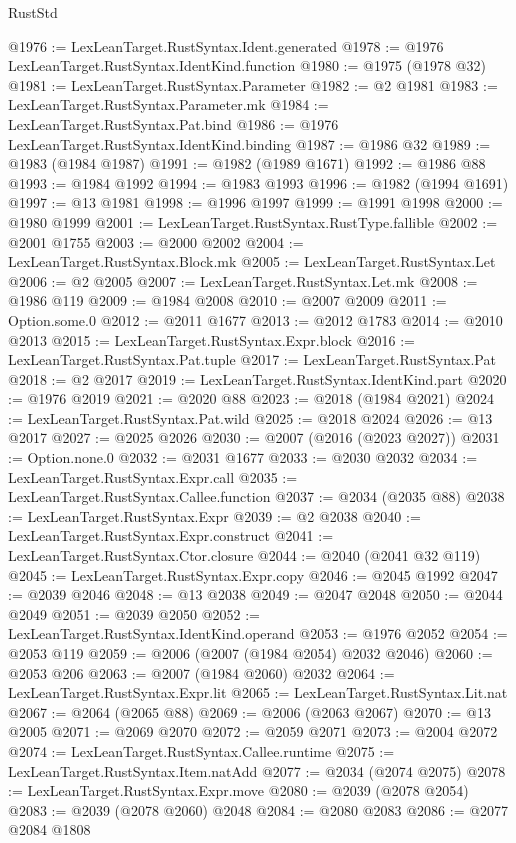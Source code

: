 \begin{lexlean}{RustStd}
\begin{coremodule}
@1976 := LexLeanTarget.RustSyntax.Ident.generated
@1978 := @1976 LexLeanTarget.RustSyntax.IdentKind.function
@1980 := @1975 (@1978 @32)
@1981 := LexLeanTarget.RustSyntax.Parameter
@1982 := @2 @1981
@1983 := LexLeanTarget.RustSyntax.Parameter.mk
@1984 := LexLeanTarget.RustSyntax.Pat.bind
@1986 := @1976 LexLeanTarget.RustSyntax.IdentKind.binding
@1987 := @1986 @32
@1989 := @1983 (@1984 @1987)
@1991 := @1982 (@1989 @1671)
@1992 := @1986 @88
@1993 := @1984 @1992
@1994 := @1983 @1993
@1996 := @1982 (@1994 @1691)
@1997 := @13 @1981
@1998 := @1996 @1997
@1999 := @1991 @1998
@2000 := @1980 @1999
@2001 := LexLeanTarget.RustSyntax.RustType.fallible
@2002 := @2001 @1755
@2003 := @2000 @2002
@2004 := LexLeanTarget.RustSyntax.Block.mk
@2005 := LexLeanTarget.RustSyntax.Let
@2006 := @2 @2005
@2007 := LexLeanTarget.RustSyntax.Let.mk
@2008 := @1986 @119
@2009 := @1984 @2008
@2010 := @2007 @2009
@2011 := Option.some.{0}
@2012 := @2011 @1677
@2013 := @2012 @1783
@2014 := @2010 @2013
@2015 := LexLeanTarget.RustSyntax.Expr.block
@2016 := LexLeanTarget.RustSyntax.Pat.tuple
@2017 := LexLeanTarget.RustSyntax.Pat
@2018 := @2 @2017
@2019 := LexLeanTarget.RustSyntax.IdentKind.part
@2020 := @1976 @2019
@2021 := @2020 @88
@2023 := @2018 (@1984 @2021)
@2024 := LexLeanTarget.RustSyntax.Pat.wild
@2025 := @2018 @2024
@2026 := @13 @2017
@2027 := @2025 @2026
@2030 := @2007 (@2016 (@2023 @2027))
@2031 := Option.none.{0}
@2032 := @2031 @1677
@2033 := @2030 @2032
@2034 := LexLeanTarget.RustSyntax.Expr.call
@2035 := LexLeanTarget.RustSyntax.Callee.function
@2037 := @2034 (@2035 @88)
@2038 := LexLeanTarget.RustSyntax.Expr
@2039 := @2 @2038
@2040 := LexLeanTarget.RustSyntax.Expr.construct
@2041 := LexLeanTarget.RustSyntax.Ctor.closure
@2044 := @2040 (@2041 @32 @119)
@2045 := LexLeanTarget.RustSyntax.Expr.copy
@2046 := @2045 @1992
@2047 := @2039 @2046
@2048 := @13 @2038
@2049 := @2047 @2048
@2050 := @2044 @2049
@2051 := @2039 @2050
@2052 := LexLeanTarget.RustSyntax.IdentKind.operand
@2053 := @1976 @2052
@2054 := @2053 @119
@2059 := @2006 (@2007 (@1984 @2054) @2032 @2046)
@2060 := @2053 @206
@2063 := @2007 (@1984 @2060) @2032
@2064 := LexLeanTarget.RustSyntax.Expr.lit
@2065 := LexLeanTarget.RustSyntax.Lit.nat
@2067 := @2064 (@2065 @88)
@2069 := @2006 (@2063 @2067)
@2070 := @13 @2005
@2071 := @2069 @2070
@2072 := @2059 @2071
@2073 := @2004 @2072
@2074 := LexLeanTarget.RustSyntax.Callee.runtime
@2075 := LexLeanTarget.RustSyntax.Item.natAdd
@2077 := @2034 (@2074 @2075)
@2078 := LexLeanTarget.RustSyntax.Expr.move
@2080 := @2039 (@2078 @2054)
@2083 := @2039 (@2078 @2060) @2048
@2084 := @2080 @2083
@2086 := @2077 @2084 @1808

\end{coremodule}
\end{lexlean}

